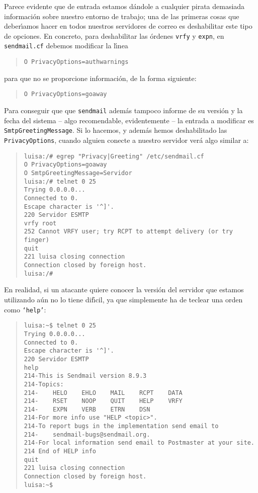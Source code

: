Parece evidente que de entrada estamos d\'andole a cualquier pirata demasiada
informaci\'on sobre nuestro entorno de trabajo; una de las primeras cosas que
deber\'{\i}amos hacer en todos nuestros servidores de correo es deshabilitar 
este tipo de opciones. En concreto, para deshabilitar las \'ordenes {\tt vrfy} y
{\tt expn}, en {\tt sendmail.cf} debemos modificar la 
l\'{\i}nea
\begin{quote}
\begin{verbatim}
O PrivacyOptions=authwarnings
\end{verbatim}
\end{quote}
para que no se proporcione informaci\'on, de la forma siguiente:
\begin{quote}
\begin{verbatim}
O PrivacyOptions=goaway
\end{verbatim}
\end{quote}
Para conseguir que que {\tt sendmail} adem\'as tampoco informe de su versi\'on 
y la fecha del sistema -- algo recomendable, evidentemente -- la entrada a
modificar es {\tt SmtpGreetingMessage}. Si lo hacemos, y adem\'as hemos 
deshabilitado las {\tt PrivacyOptions}, cuando alguien conecte a nuestro 
servidor ver\'a algo similar a:
\begin{quote}
\begin{verbatim}
luisa:/# egrep "Privacy|Greeting" /etc/sendmail.cf 
O PrivacyOptions=goaway
O SmtpGreetingMessage=Servidor
luisa:/# telnet 0 25
Trying 0.0.0.0...
Connected to 0.
Escape character is '^]'.
220 Servidor ESMTP
vrfy root
252 Cannot VRFY user; try RCPT to attempt delivery (or try finger)
quit
221 luisa closing connection
Connection closed by foreign host.
luisa:/# 
\end{verbatim}
\end{quote}
En realidad, si un atacante quiere conocer la versi\'on del servidor que 
estamos utilizando a\'un no lo tiene dif\'{\i}cil, ya que simplemente ha de 
teclear una orden como {\tt `help'}:
\begin{quote}
\begin{verbatim}
luisa:~$ telnet 0 25
Trying 0.0.0.0...
Connected to 0.
Escape character is '^]'.
220 Servidor ESMTP
help
214-This is Sendmail version 8.9.3
214-Topics:
214-    HELO    EHLO    MAIL    RCPT    DATA
214-    RSET    NOOP    QUIT    HELP    VRFY
214-    EXPN    VERB    ETRN    DSN
214-For more info use "HELP <topic>".
214-To report bugs in the implementation send email to
214-    sendmail-bugs@sendmail.org.
214-For local information send email to Postmaster at your site.
214 End of HELP info
quit
221 luisa closing connection
Connection closed by foreign host.
luisa:~$ 
\end{verbatim}
\end{quote}
